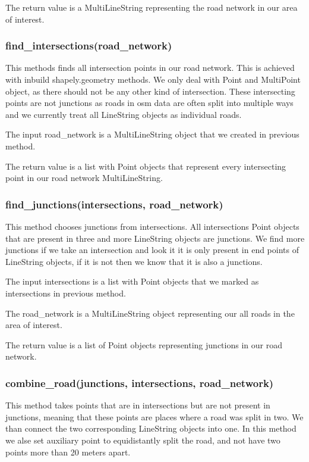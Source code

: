 \documentclass[oneside]{article}
\begin{document}
            The return value is a MultiLineString representing the road network in our area of interest.

            \subsubsection{find\_intersections(road\_network)}
            This methods finds all intersection points in our road network. This is achieved with inbuild shapely.geometry methods. We only deal with Point and MultiPoint object, as there should not be any other kind of intersection. These intersecting points are not junctions as roads in osm data are often split into multiple ways and we currently treat all LineString objects as individual roads.

            The input road\_network is a MultiLineString object that we created in previous method.

            The return value is a list with Point objects that represent every intersecting point in our road network MultiLineString.

            \subsubsection{find\_junctions(intersections, road\_network)}
            This method chooses junctions from intersections. All intersections Point objects that are present in three and more LineString objects are junctions. We find more junctions if we take an intersection and look it it is only present in end points of LineString objects, if it is not then we know that it is also a junctions.

            The input intersections is a list with Point objects that we marked as intersections in previous method.

            The road\_network is a MultiLineString object representing our all roads in the area of interest.

            The return value is a list of Point objects representing junctions in our road network.

            \subsubsection{combine\_road(junctions, intersections, road\_network)}
            This method takes points that are in intersections but are not present in junctions, meaning that these points are places where a road was split in two. We than connect the two corresponding LineString objects into one. In this method we alse set auxiliary point to equidistantly split the road, and not have two points more than 20 meters apart.
\end{document}
